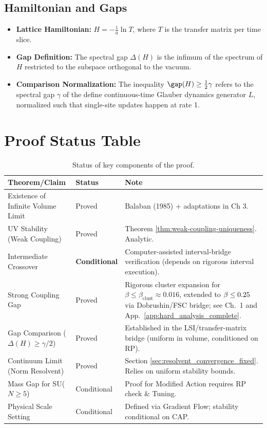 \subsection{Hamiltonian and Gaps}
\begin{itemize}
    \item \textbf{Lattice Hamiltonian:} $H = -\frac{1}{a} \ln T$, where $T$ is the transfer matrix per time slice.
    \item \textbf{Gap Definition:} The spectral gap $\Delta(H)$ is the infimum of the spectrum of $H$ restricted to the subspace orthogonal to the vacuum.
    \item \textbf{Comparison Normalization:} The inequality $\gap(H) \ge \frac{1}{2}\gamma$ refers to the spectral gap $\gamma$ of the define continuous-time Glauber dynamics generator $L$, normalized such that single-site updates happen at rate 1.
\end{itemize}

\section{Proof Status Table}

\begin{table}[h]
\centering
\begin{tabular}{|p{}|p{}|p{}|}
\hline
\textbf{Theorem/Claim} & \textbf{Status} & \textbf{Note} \\ \hline
Existence of Infinite Volume Limit & Proved & Balaban (1985) + adaptations in Ch 3. \\ \hline
UV Stability (Weak Coupling) & Proved & Theorem \ref{thm:weak-coupling-uniqueness}. Analytic. \\ \hline
Intermediate Crossover & \textbf{Conditional} & Computer-assisted interval-bridge verification (depends on rigorous interval execution). \\ \hline
Strong Coupling Gap & Proved & Rigorous cluster expansion for $\beta \le \beta_{\mathrm{clust}}\approx 0.016$, extended to $\beta \le 0.25$ via Dobrushin/FSC bridge; see Ch.~1 and App.~\ref{app:hard_analysis_complete}. \\ \hline
Gap Comparison ($\Delta(H) \ge \gamma/2$) & Proved & Established in the LSI/transfer-matrix bridge (uniform in volume, conditioned on RP). \\ \hline
Continuum Limit (Norm Resolvent) & Proved & Section \ref{sec:resolvent_convergence_fixed}. Relies on uniform stability bounds. \\ \hline
Mass Gap for SU($N\ge 5$) & Conditional & Proof for Modified Action requires RP check \& Tuning. \\ \hline
Physical Scale Setting & Conditional & Defined via Gradient Flow; stability conditional on CAP. \\ \hline
\end{tabular}
\caption{Status of key components of the proof.}
\label{tab:proof_status}
\end{table}
